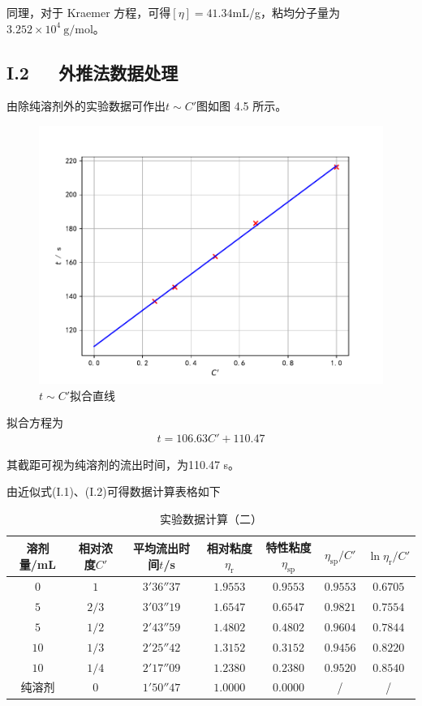 \documentclass[12pt]{ctexart}
\numberwithin{equation}{section}
\begin{document}
同理，对于 Kraemer 方程，可得$[\eta] = 41.34$mL/g，粘均分子量为
$3.252\times 10^{4}~\mathrm{g/mol}$。

\subsection*{I.2~~~外推法数据处理}

由除纯溶剂外的实验数据可作出$t\sim C'$图如图 4.5 所示。
\begin{figure}[!h]
    \centering
    \includegraphics[scale=0.8]{fitting2.pdf}
    \caption{$t\sim C'$拟合直线}
\end{figure}

拟合方程为
\begin{align}
    t = 106.63 C' +110.47
    \tag{I.11}
\end{align}

其截距可视为纯溶剂的流出时间，为110.47 s。

由近似式(I.1)、(I.2)可得数据计算表格如下
\begin{longtable}{ccccccc}
    \caption{实验数据计算（二）} \\
    \hline
    溶剂量/mL & 相对浓度$C'$ & 平均流出时间$t$/s & 相对粘度$\eta_\text{r}$ & 特性粘度$\eta_{\text{sp}}$ & $\eta_\text{sp}/C'$ & $\ln\eta_\text{r}/C'$ \\
    \hline
    $0$  & $ 1 $ & $3'36''37$ & $1.9553$ & $0.9553$ & $0.9553$ & $0.6705$ \\
    $5$  & $2/3$ & $3'03''19$ & $1.6547$ & $0.6547$ & $0.9821$ & $0.7554$ \\
    $5$  & $1/2$ & $2'43''59$ & $1.4802$ & $0.4802$ & $0.9604$ & $0.7844$ \\
    $10$ & $1/3$ & $2'25''42$ & $1.3152$ & $0.3152$ & $0.9456$ & $0.8220$ \\
    $10$ & $1/4$ & $2'17''09$ & $1.2380$ & $0.2380$ & $0.9520$ & $0.8540$ \\
    纯溶剂 & $0$ & $1'50''47$ & $1.0000$ & $0.0000$ & / & / \\
    \hline
\end{longtable}
\end{document}
